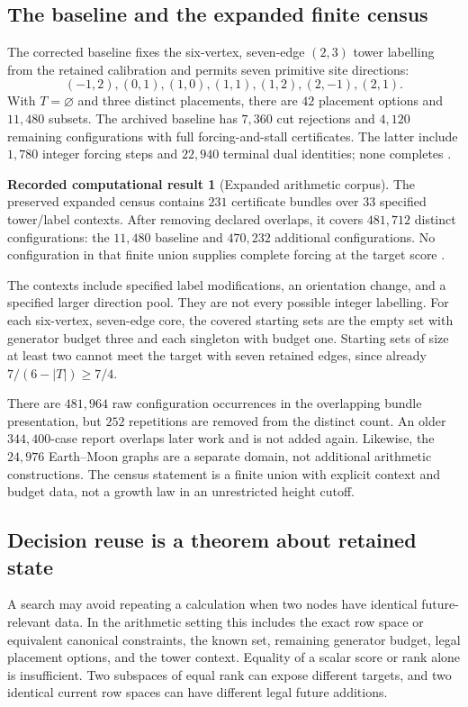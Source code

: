 \documentclass[11pt,letterpaper]{article}
\theoremstyle{definition}
\newtheorem{result}[theorem]{Recorded computational result}
\theoremstyle{remark}\newtheorem{remark}[theorem]{Remark}
\begin{document}
\subsection{The baseline and the expanded finite census}
The corrected baseline fixes the six-vertex, seven-edge $(2,3)$ tower labelling from the retained calibration and permits seven primitive site directions:
\[
(-1,2),(0,1),(1,0),(1,1),(1,2),(2,-1),(2,1).
\]
With $T=\varnothing$ and three distinct placements, there are $42$ placement options and $11,480$ subsets. The archived baseline has $7,360$ cut rejections and $4,120$ remaining configurations with full forcing-and-stall certificates. The latter include $1,780$ integer forcing steps and $22,940$ terminal dual identities; none completes \cite{BeasleyFrontier}.

\begin{result}[Expanded arithmetic corpus]\label{res:akfinite}
The preserved expanded census contains $231$ certificate bundles over $33$ specified tower/label contexts. After removing declared overlaps, it covers $481,712$ distinct configurations: the $11,480$ baseline and $470,232$ additional configurations. No configuration in that finite union supplies complete forcing at the target score \cite{BeasleyDAG,BeasleyReview}.
\end{result}
The contexts include specified label modifications, an orientation change, and a specified larger direction pool. They are not every possible integer labelling. For each six-vertex, seven-edge core, the covered starting sets are the empty set with generator budget three and each singleton with budget one. Starting sets of size at least two cannot meet the target with seven retained edges, since already $7/(6-|T|)\geq7/4$.

There are $481,964$ raw configuration occurrences in the overlapping bundle presentation, but $252$ repetitions are removed from the distinct count. An older $344,400$-case report overlaps later work and is not added again. Likewise, the $24,976$ Earth--Moon graphs are a separate domain, not additional arithmetic constructions. The census statement is a finite union with explicit context and budget data, not a growth law in an unrestricted height cutoff.

\subsection{Decision reuse is a theorem about retained state}
A search may avoid repeating a calculation when two nodes have identical future-relevant data. In the arithmetic setting this includes the exact row space or equivalent canonical constraints, the known set, remaining generator budget, legal placement options, and the tower context. Equality of a scalar score or rank alone is insufficient. Two subspaces of equal rank can expose different targets, and two identical current row spaces can have different legal future additions.
\end{document}
